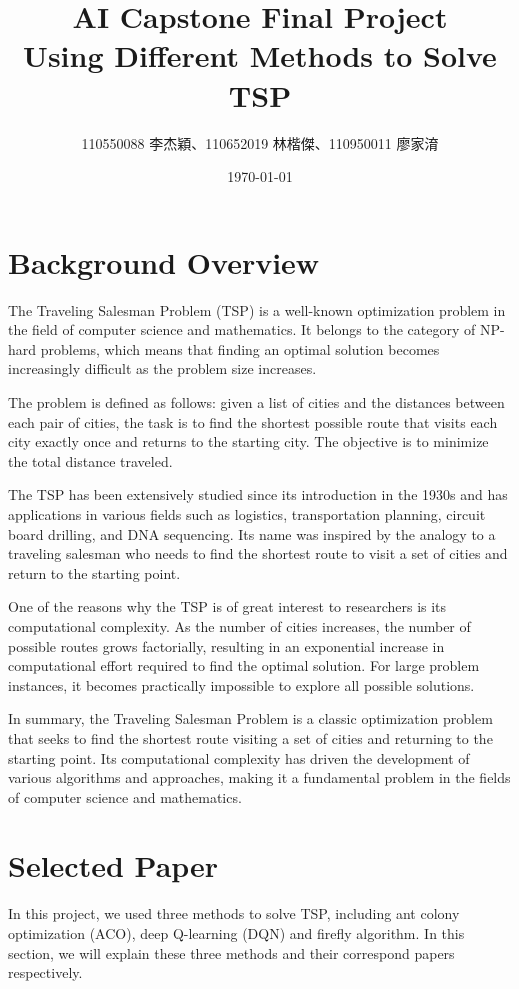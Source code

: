 \documentclass[twocolumn, a4paper]{extarticle}
\title{AI Capstone Final Project \\ Using Different Methods to Solve TSP}
\author{110550088 李杰穎、110652019 林楷傑、110950011 廖家淯}
\date{\today}
\begin{document}
\maketitle

\section{Background Overview}

The Traveling Salesman Problem (TSP) is a well-known optimization problem in the field of computer science and mathematics. It belongs to the category of NP-hard problems, which means that finding an optimal solution becomes increasingly difficult as the problem size increases.

The problem is defined as follows: given a list of cities and the distances between each pair of cities, the task is to find the shortest possible route that visits each city exactly once and returns to the starting city. The objective is to minimize the total distance traveled.

The TSP has been extensively studied since its introduction in the 1930s and has applications in various fields such as logistics, transportation planning, circuit board drilling, and DNA sequencing. Its name was inspired by the analogy to a traveling salesman who needs to find the shortest route to visit a set of cities and return to the starting point.

One of the reasons why the TSP is of great interest to researchers is its computational complexity. As the number of cities increases, the number of possible routes grows factorially, resulting in an exponential increase in computational effort required to find the optimal solution. For large problem instances, it becomes practically impossible to explore all possible solutions.

In summary, the Traveling Salesman Problem is a classic optimization problem that seeks to find the shortest route visiting a set of cities and returning to the starting point. Its computational complexity has driven the development of various algorithms and approaches, making it a fundamental problem in the fields of computer science and mathematics.


\section{Selected Paper}

In this project, we used three methods to solve TSP, including ant colony optimization (ACO), deep Q-learning (DQN) and firefly algorithm. In this section, we will explain these three methods and their correspond papers respectively.
\end{document}
